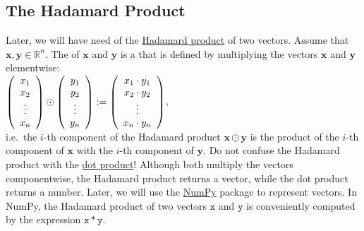\subsection{The Hadamard Product}
Later, we will have need of the \href{https://en.wikipedia.org/wiki/Hadamard_product_(matrices)}{Hadamard product} 
 of two vectors.  Assume that $\mathbf{x}, \mathbf{y} \in \mathbb{R}^n$.  The  of
$\mathbf{x}$ and $\mathbf{y}$ is a  that is defined by multiplying the vectors $\mathbf{x}$ and $\mathbf{y}$ elementwise:
\\[0.2cm]
\hspace*{1.3cm}
$\left(
  \begin{array}[c]{c}
    x_1 \\
    x_2 \\
    \vdots \\
    x_n
  \end{array}
\right) \odot
\left(
  \begin{array}[c]{c}
    y_1 \\
    y_2 \\
    \vdots \\
    y_n
  \end{array}
\right) := 
\left(
  \begin{array}[c]{c}
    x_1 \cdot y_1 \\
    x_2 \cdot y_2 \\
    \vdots \\
    x_n \cdot y_n
  \end{array}
\right)
$,
\\[0.2cm]
i.e.~the $i$-th component of the Hadamard product $\mathbf{x} \odot \mathbf{y}$ is the product of the $i$-th
component of $\mathbf{x}$ with the $i$-th component of $\mathbf{y}$.  Do not confuse the Hadamard product with
the \href{https://en.wikipedia.org/wiki/Dot_product}{dot product}!  Although both multiply the vectors
componentwise, the Hadamard product returns a vector, while the dot product returns a number.  Later, we will
use the \href{http://www.numpy.org}{NumPy} package to represent vectors.  In NumPy, the Hadamard product of two
vectors $\mathtt{x}$ and $\mathtt{y}$ is conveniently computed by the expression $\mathtt{x} * \mathtt{y}$.

